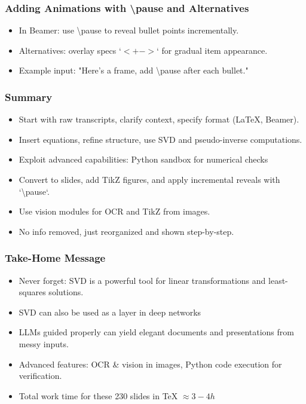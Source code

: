 \documentclass[aspectratio=169]{beamer}
\begin{document}
\begin{frame}
\frametitle{Adding Animations with \textbackslash pause and Alternatives}
\begin{itemize}[<+->]
\item In Beamer: use \textbackslash pause to reveal bullet points incrementally.
\item Alternatives: overlay specs `$<+->$` for gradual item appearance.
\item Example input: "Here’s a frame, add \textbackslash pause after each bullet."
\end{itemize}
\end{frame}





\begin{frame}
\frametitle{Summary}
\begin{itemize}[<+->]
\item Start with raw transcripts, clarify context, specify format (LaTeX, Beamer).
\item Insert equations, refine structure, use SVD and pseudo-inverse computations.
\item Exploit advanced capabilities: Python sandbox for numerical checks
\item Convert to slides, add TikZ figures, and apply incremental reveals with `\textbackslash pause`.
\item Use vision modules for OCR and TikZ from images.
\item No info removed, just reorganized and shown step-by-step.
\end{itemize}
\end{frame}

\begin{frame}
\frametitle{Take-Home Message}
\begin{itemize}[<+->]
\item Never forget: SVD is a powerful tool for linear transformations and least-squares solutions.
\item SVD can also be used as a layer in deep networks
\item LLMs guided properly can yield elegant documents and presentations from messy inputs.
\item Advanced features: OCR \& vision in images, Python code execution for verification.
\item Total work time for these 230 slides in TeX $\approx 3-4 h$
\end{itemize}
\end{frame}
\end{document}
